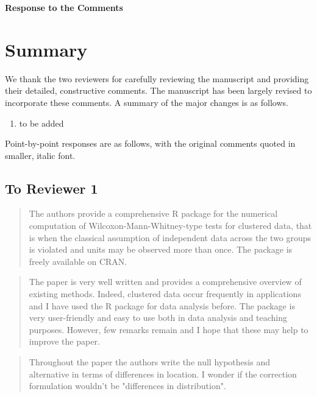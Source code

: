 \documentclass[12pt]{article}
\newenvironment{comment}%
{\begin{quotation}\noindent\small\it\ignorespaces%
  }{\end{quotation}}
\begin{document}
\begin{center}
  {\Large\bf Response to the Comments}
\end{center}

\section*{Summary}

We thank the two reviewers for carefully reviewing the manuscript and
providing their detailed, constructive comments.  
The manuscript has been largely revised to incorporate these comments. 
A summary of the major changes is as follows.

\begin{enumerate}
\item to be added
\end{enumerate}

Point-by-point responses are as follows, with the original comments
quoted in smaller, italic font.


\subsection*{To Reviewer 1}

\begin{comment}
  The authors provide a comprehensive R package for the numerical computation of
Wilcoxon-Mann-Whitney-type tests for clustered data, that is when the classical
assumption of independent data across the two groups is violated and units may be
observed more than once. The package is freely available on CRAN.
\end{comment}

\begin{comment}
The paper is very well written and provides a comprehensive overview of existing
methods. Indeed, clustered data occur frequently in applications and I have used the
R package for data analysis before. The package is very user-friendly and easy to
use both in data analysis and teaching purposes. However, few remarks remain and I
hope that these may help to improve the paper.
\end{comment}

\begin{comment}
Throughout the paper the authors write the null hypothesis and alternative in
terms of differences in location. I wonder if the correction formulation wouldn't
be "differences in distribution".
\end{comment}
\end{document}

